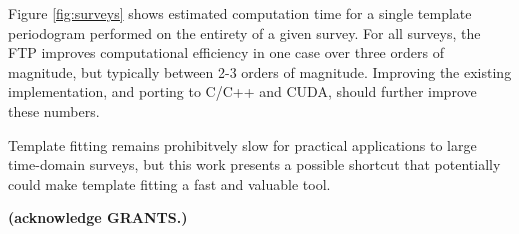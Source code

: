 \documentclass[iop]{emulateapj}
\newcommand{\todo}[1]{{\bf #1}}
\begin{document}
Figure \ref{fig:surveys} shows estimated computation time for a single
template periodogram performed on the entirety of a given survey. For all
surveys, the FTP improves computational efficiency in one case over
three orders of magnitude, but typically between 2-3 orders of magnitude.
Improving the existing implementation, and porting to C/C++ and CUDA,
should further improve these numbers.

Template fitting remains prohibitvely slow for practical applications to
large time-domain surveys, but this work presents a possible shortcut
that potentially could make template fitting a fast and valuable tool.

\begin{acknowledgements}
\todo{(acknowledge GRANTS.)}
\end{acknowledgements}


\end{document}
